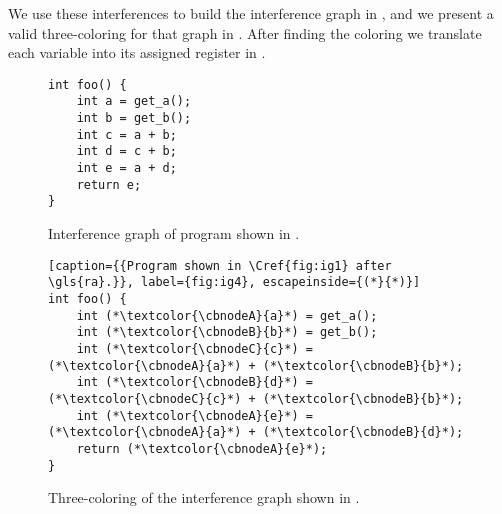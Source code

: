 We use these interferences to build the interference graph in , and we present a valid three-coloring for that graph in . After finding the coloring we translate each variable into its assigned register in .

\begin{figure}[ht]
\centering
\begin{minipage}{0.48\textwidth}
\lstset{style=C}
\begin{lstlisting}[caption={C program returning $2a + 3b$.}, label={fig:ig1}]
int foo() {
    int a = get_a();
    int b = get_b();
    int c = a + b;
    int d = c + b;
    int e = a + d;
    return e;
}
\end{lstlisting}
\end{minipage}
\hfill
\begin{minipage}{0.48\textwidth}
  \centering
  \caption{Interference graph of program shown in .}
  \label{fig:ig2}
\end{minipage}
\end{figure}

\begin{figure}[ht]
\centering
\begin{minipage}{0.48\textwidth}
  \centering
  \caption{Three-coloring of the interference graph shown in .}
  \label{fig:ig3}
\end{minipage}
\hfill
\begin{minipage}{0.48\textwidth}
\lstset{style=C}
\begin{lstlisting}[caption={{Program shown in \Cref{fig:ig1} after \gls{ra}.}}, label={fig:ig4}, escapeinside={(*}{*)}]
int foo() {
    int (*\textcolor{\cbnodeA}{a}*) = get_a();
    int (*\textcolor{\cbnodeB}{b}*) = get_b();
    int (*\textcolor{\cbnodeC}{c}*) = (*\textcolor{\cbnodeA}{a}*) + (*\textcolor{\cbnodeB}{b}*);
    int (*\textcolor{\cbnodeB}{d}*) = (*\textcolor{\cbnodeC}{c}*) + (*\textcolor{\cbnodeB}{b}*);
    int (*\textcolor{\cbnodeA}{e}*) = (*\textcolor{\cbnodeA}{a}*) + (*\textcolor{\cbnodeB}{d}*);
    return (*\textcolor{\cbnodeA}{e}*);
}
\end{lstlisting}
\end{minipage}
\end{figure}

